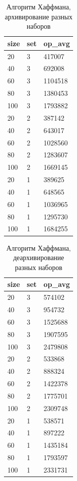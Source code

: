 \documentclass[a4paper,12pt]{article} %
\begin{document}
    \begin{table}[!htb]
        \centering
        \caption{Алгоритм Хаффмана, архивирование разных наборов}
        \begin{tabular}{|l|l|l|}
            \hline
            size & set & op\_avg \\ \hline
            20   & 3   & 417007  \\ \hline
            40   & 3   & 692008  \\ \hline
            60   & 3   & 1104518 \\ \hline
            80   & 3   & 1380453 \\ \hline
            100  & 3   & 1793882 \\ \hline
            20   & 2   & 387142  \\ \hline
            40   & 2   & 643017  \\ \hline
            60   & 2   & 1028560 \\ \hline
            80   & 2   & 1283607 \\ \hline
            100  & 2   & 1669145 \\ \hline
            20   & 1   & 389625  \\ \hline
            40   & 1   & 648565  \\ \hline
            60   & 1   & 1036965 \\ \hline
            80   & 1   & 1295730 \\ \hline
            100  & 1   & 1684255 \\ \hline
        \end{tabular}
    \end{table}
    \begin{table}[!htb]
        \centering
        \caption{Алгоритм Хаффмана, деархивирование разных наборов}
        \begin{tabular}{|l|l|l|}
            \hline
            size & set & op\_avg \\ \hline
            20 & 3 & 574102 \\ \hline
            40 & 3 & 954732 \\ \hline
            60 & 3 & 1525688 \\ \hline
            80 & 3 & 1907595 \\ \hline
            100 & 3 & 2479808 \\ \hline
            20 & 2 & 533868 \\ \hline
            40 & 2 & 888324 \\ \hline
            60 & 2 & 1422378 \\ \hline
            80 & 2 & 1775701 \\ \hline
            100 & 2 & 2309748 \\ \hline
            20 & 1 & 538571 \\ \hline
            40 & 1 & 897222 \\ \hline
            60 & 1 & 1435184 \\ \hline
            80 & 1 & 1793597 \\ \hline
            100 & 1 & 2331731 \\ \hline
        \end{tabular}
    \end{table}
    \clearpage
\end{document}
